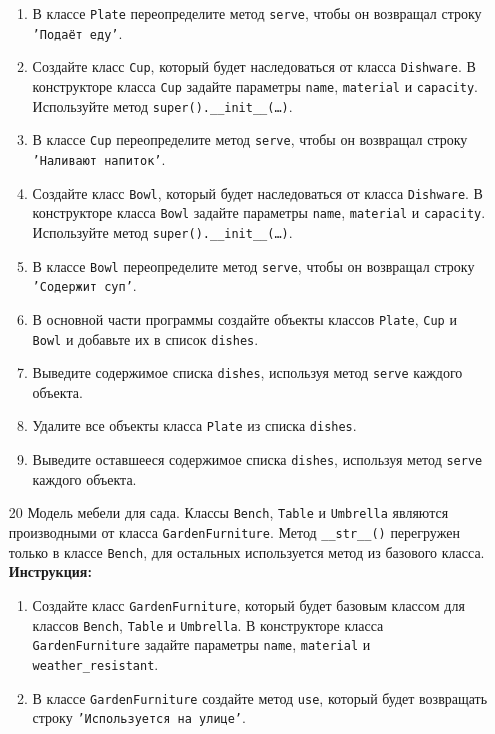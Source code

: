 \begin{enumerate}
\begin{enumerate}
    \item В классе \texttt{Plate} переопределите метод \texttt{serve}, чтобы он возвращал строку \texttt{'Подаёт еду'}.
    \item Создайте класс \texttt{Cup}, который будет наследоваться от класса \texttt{Dishware}. В конструкторе класса \texttt{Cup} задайте параметры \texttt{name}, \texttt{material} и \texttt{capacity}. Используйте метод \texttt{super().\_\_init\_\_(\ldots)}.
    \item В классе \texttt{Cup} переопределите метод \texttt{serve}, чтобы он возвращал строку \texttt{'Наливают напиток'}.
    \item Создайте класс \texttt{Bowl}, который будет наследоваться от класса \texttt{Dishware}. В конструкторе класса \texttt{Bowl} задайте параметры \texttt{name}, \texttt{material} и \texttt{capacity}. Используйте метод \texttt{super().\_\_init\_\_(\ldots)}.
    \item В классе \texttt{Bowl} переопределите метод \texttt{serve}, чтобы он возвращал строку \texttt{'Содержит суп'}.
    \item В основной части программы создайте объекты классов \texttt{Plate}, \texttt{Cup} и \texttt{Bowl} и добавьте их в список \texttt{dishes}.
    \item Выведите содержимое списка \texttt{dishes}, используя метод \texttt{serve} каждого объекта.
    \item Удалите все объекты класса \texttt{Plate} из списка \texttt{dishes}.
    \item Выведите оставшееся содержимое списка \texttt{dishes}, используя метод \texttt{serve} каждого объекта.
\end{enumerate}
\item[20]
Модель мебели для сада. Классы \texttt{Bench}, \texttt{Table} и \texttt{Umbrella} являются производными от класса \texttt{GardenFurniture}. Метод \texttt{\_\_str\_\_()} перегружен только в классе \texttt{Bench}, для остальных используется метод из базового класса.
\textbf{Инструкция:}
\begin{enumerate}
    \item Создайте класс \texttt{GardenFurniture}, который будет базовым классом для классов \texttt{Bench}, \texttt{Table} и \texttt{Umbrella}. В конструкторе класса \texttt{GardenFurniture} задайте параметры \texttt{name}, \texttt{material} и \texttt{weather\_resistant}.
    \item В классе \texttt{GardenFurniture} создайте метод \texttt{use}, который будет возвращать строку \texttt{'Используется на улице'}.

\end{enumerate}
\end{enumerate}
